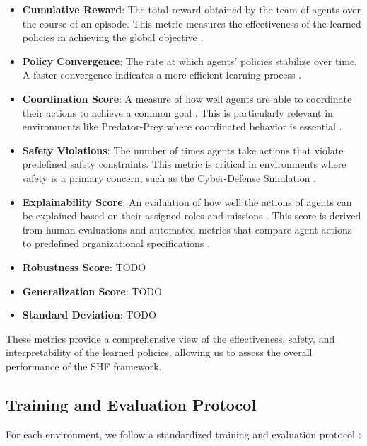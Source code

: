 \documentclass[sigconf,anonymous]{aamas}
\begin{document}
\begin{itemize}
    \item \textbf{Cumulative Reward}: The total reward obtained by the team of agents over the course of an episode. This metric measures the effectiveness of the learned policies in achieving the global objective \cite{foerster2016learning, lowe2017multi}.
    \item \textbf{Policy Convergence}: The rate at which agents' policies stabilize over time. A faster convergence indicates a more efficient learning process \cite{lowe2017multi, foerster2018counterfactual}.
    \item \textbf{Coordination Score}: A measure of how well agents are able to coordinate their actions to achieve a common goal \cite{foerster2018counterfactual}. This is particularly relevant in environments like Predator-Prey where coordinated behavior is essential \cite{foerster2016learning}.
    \item \textbf{Safety Violations}: The number of times agents take actions that violate predefined safety constraints. This metric is critical in environments where safety is a primary concern, such as the Cyber-Defense Simulation \cite{bastani2018verifiable, wei2019safe}.
    \item \textbf{Explainability Score}: An evaluation of how well the actions of agents can be explained based on their assigned roles and missions \cite{ghosal2021explainable}. This score is derived from human evaluations and automated metrics that compare agent actions to predefined organizational specifications \cite{su2021toward}.
    \item \textbf{Robustness Score}: TODO
    \item \textbf{Generalization Score}: TODO
    \item \textbf{Standard Deviation}: TODO
\end{itemize}


These metrics provide a comprehensive view of the effectiveness, safety, and interpretability of the learned policies, allowing us to assess the overall performance of the SHF framework.

\subsection{Training and Evaluation Protocol}
For each environment, we follow a standardized training and evaluation protocol \cite{foerster2018counterfactual, soule2024}:
\end{document}
